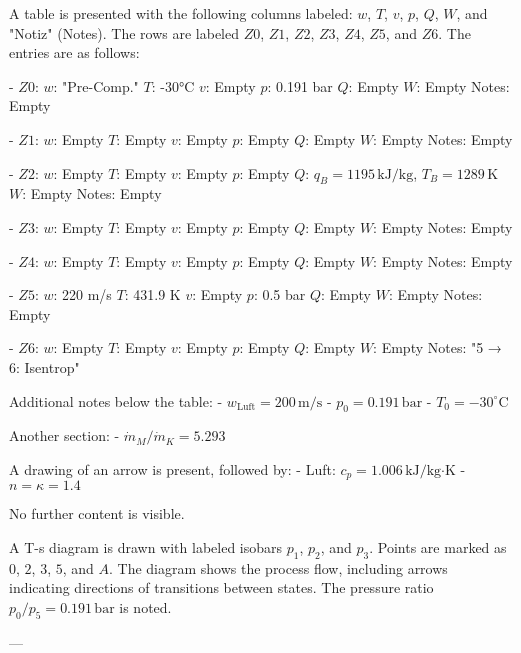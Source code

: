A table is presented with the following columns labeled: \( w \), \( T \), \( v \), \( p \), \( Q \), \( W \), and "Notiz" (Notes). The rows are labeled \( Z0 \), \( Z1 \), \( Z2 \), \( Z3 \), \( Z4 \), \( Z5 \), and \( Z6 \). The entries are as follows:  

- \( Z0 \):  
  \( w \): "Pre-Comp."  
  \( T \): -30°C  
  \( v \): Empty  
  \( p \): 0.191 bar  
  \( Q \): Empty  
  \( W \): Empty  
  Notes: Empty  

- \( Z1 \):  
  \( w \): Empty  
  \( T \): Empty  
  \( v \): Empty  
  \( p \): Empty  
  \( Q \): Empty  
  \( W \): Empty  
  Notes: Empty  

- \( Z2 \):  
  \( w \): Empty  
  \( T \): Empty  
  \( v \): Empty  
  \( p \): Empty  
  \( Q \): \( q_B = 1195 \, \text{kJ/kg} \), \( T_B = 1289 \, \text{K} \)  
  \( W \): Empty  
  Notes: Empty  

- \( Z3 \):  
  \( w \): Empty  
  \( T \): Empty  
  \( v \): Empty  
  \( p \): Empty  
  \( Q \): Empty  
  \( W \): Empty  
  Notes: Empty  

- \( Z4 \):  
  \( w \): Empty  
  \( T \): Empty  
  \( v \): Empty  
  \( p \): Empty  
  \( Q \): Empty  
  \( W \): Empty  
  Notes: Empty  

- \( Z5 \):  
  \( w \): 220 m/s  
  \( T \): 431.9 K  
  \( v \): Empty  
  \( p \): 0.5 bar  
  \( Q \): Empty  
  \( W \): Empty  
  Notes: Empty  

- \( Z6 \):  
  \( w \): Empty  
  \( T \): Empty  
  \( v \): Empty  
  \( p \): Empty  
  \( Q \): Empty  
  \( W \): Empty  
  Notes: "5 → 6: Isentrop"  

Additional notes below the table:  
- \( w_{\text{Luft}} = 200 \, \text{m/s} \)  
- \( p_0 = 0.191 \, \text{bar} \)  
- \( T_0 = -30^\circ \text{C} \)  

Another section:  
- \( \dot{m}_M / \dot{m}_K = 5.293 \)  

A drawing of an arrow is present, followed by:  
- Luft: \( c_p = 1.006 \, \text{kJ/kg·K} \)  
- \( n = \kappa = 1.4 \)  

No further content is visible.

A T-s diagram is drawn with labeled isobars \( p_1 \), \( p_2 \), and \( p_3 \). Points are marked as \( 0 \), \( 2 \), \( 3 \), \( 5 \), and \( A \). The diagram shows the process flow, including arrows indicating directions of transitions between states. The pressure ratio \( p_0/p_5 = 0.191 \, \text{bar} \) is noted.

---